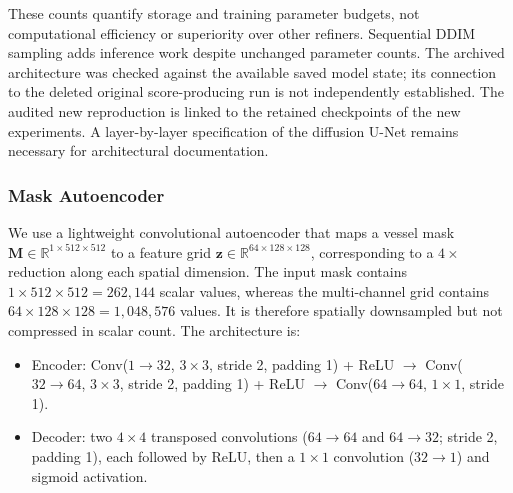 \documentclass[jimaging,article,submit,pdftex,moreauthors]
  {Definitions/mdpi}
\begin{document}
\begin{table}[htbp]
\centering
\caption{Directly comparable parameter counts using the same convention. Total counts include frozen modules; the last column counts parameters updated during refinement training, when the backbone and mask autoencoder are frozen. The baseline alone has 1,946,961 trainable parameters during its own training.}
\label{tab:complete_parameter_counts}
\small
{}
\end{table}

These counts quantify storage and training parameter budgets, not computational efficiency or superiority over other refiners. Sequential DDIM sampling adds inference work despite unchanged parameter counts. The archived architecture was checked against the available saved model state; its connection to the deleted original score-producing run is not independently established. The audited new reproduction is linked to the retained checkpoints of the new experiments. A layer-by-layer specification of the diffusion U-Net remains necessary for architectural documentation.

\subsubsection{Mask Autoencoder}

We use a lightweight convolutional autoencoder that maps a vessel mask $\mathbf{M}\in\mathbb{R}^{1\times512\times512}$ to a feature grid $\mathbf{z}\in\mathbb{R}^{64\times128\times128}$, corresponding to a $4\times$ reduction along each spatial dimension. The input mask contains $1\times512\times512=262{,}144$ scalar values, whereas the multi-channel grid contains $64\times128\times128=1{,}048{,}576$ values. It is therefore spatially downsampled but not compressed in scalar count. The architecture is:
\begin{itemize}
  \item Encoder: Conv($1\rightarrow32$, $3\times3$, stride 2, padding 1) + ReLU $\rightarrow$ Conv($32\rightarrow64$, $3\times3$, stride 2, padding 1) + ReLU $\rightarrow$ Conv($64\rightarrow64$, $1\times1$, stride 1).
  \item Decoder: two $4\times4$ transposed convolutions ($64\rightarrow64$ and $64\rightarrow32$; stride 2, padding 1), each followed by ReLU, then a $1\times1$ convolution ($32\rightarrow1$) and sigmoid activation.
\end{itemize}
\end{document}
